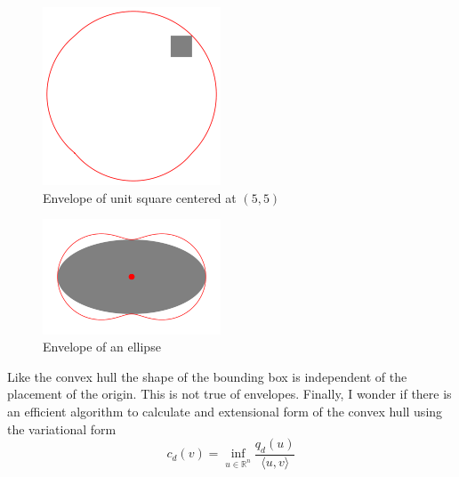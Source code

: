 \documentclass[11pt]{amsart}
\begin{document}
\begin{figure}[h]
 \centering
\includegraphics[width=150pt]{sq1_11.png}
\caption{Envelope of unit square centered at $(5,5)$}
\end{figure}

\begin{figure}[h]
 \centering
\includegraphics[width=150pt]{c1_00.png}
\caption{Envelope of an ellipse}
\end{figure}

Like the convex hull the shape of the bounding box is independent of the placement of the origin. This is not true of envelopes.
Finally, I wonder if there is an efficient algorithm to calculate and extensional form of the convex hull using the variational form
$$c_d(v) = \inf_{u \in \mathbb{R}^n}  \frac{q_d(u)}{\langle u, v \rangle}$$
\end{document}
